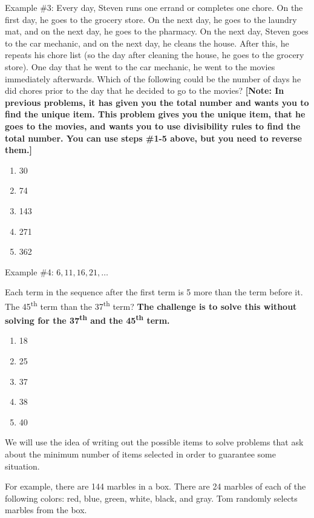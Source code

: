 \documentclass[12pt]{book}
\begin{document}
\vfill
Example \#3: Every day, Steven runs one errand or completes one chore. On the first day, he goes to the grocery store. On the next day, he goes to the laundry mat, and on the next day, he goes to the pharmacy. On the next day, Steven goes to the car mechanic, and on the next day, he cleans the house. After this, he repeats his chore list (so the day after cleaning the house, he goes to the grocery store). One day that he went to the car mechanic, he went to the movies immediately afterwards. Which of the following could be the number of days he did chores prior to the day that he decided to go to the movies? \textbf{[Note: In previous problems, it has given you the total number and wants you to find the unique item. This problem gives you the unique item, that he goes to the movies, and wants you to use divisibility rules to find the total number. You can use steps \#1-5 above, but you need to reverse them.]}

\begin{enumerate}[label=(\Alph*)]
\item 30
\item 74
\item 143	%
\item 271
\item 362
\end{enumerate}

\vfill
Example \#4: $6, 11, 16, 21, \ldots$

\bigskip
Each term in the sequence after the first term is 5 more than the term before it. The 45\textsuperscript{th} term than the 37\textsuperscript{th} term? \textbf{The challenge is to solve this without solving for the 37\textsuperscript{th} and the 45\textsuperscript{th} term.}

\begin{enumerate}[label=(\Alph*)]
\item 18
\item 25		%
\item 37
\item 38
\item 40
\end{enumerate}

\vfill
We will use the idea of writing out the possible items to solve problems that ask about the minimum number of items selected in order to guarantee some situation. 

\bigskip
For example, there are 144 marbles in a box. There are 24 marbles of each of the following colors: red, blue, green, white, black, and gray. Tom randomly selects marbles from the box.
\end{document}
